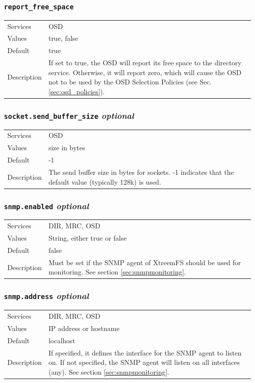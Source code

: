 \documentclass[a4paper,10pt]{book}
\begin{document}
\subsubsection{\texttt{report\_free\_space}}
\begin{tabular}{lp{10cm}}
 Services & OSD\\
 Values   & true, false\\
 Default  & true\\
 Description & If set to true, the OSD will report its free space to the directory service. Otherwise, it will report zero, which will cause the OSD not to be used by the OSD Selection Policies (see Sec. \ref{sec:osd_policies}).
\end{tabular}

\subsubsection{\texttt{socket.send\_buffer\_size} \textit{optional}}
\begin{tabular}{lp{10cm}}
 Services & OSD\\
 Values   & size in bytes\\
 Default  & -1 \\
 Description & The send buffer size in bytes for sockets. -1 indicates that the default value (typically 128k) is used.
\end{tabular}

\subsubsection{\texttt{snmp.enabled} \textit{optional}}
\begin{tabular}{lp{10cm}}
 Services & DIR, MRC, OSD\\
 Values   & String, either true or false \\
 Default  & false\\
 Description & Must be set if the SNMP agent of XtreemFS should be used for monitoring. See section \ref{sec:snmpmonitoring}.
\end{tabular}

\subsubsection{\texttt{snmp.address} \textit{optional}}
\begin{tabular}{lp{10cm}}
 Services & DIR, MRC, OSD\\
 Values   & IP address or hostname \\
 Default  & localhost \\
 Description & If specified, it defines the interface for the SNMP agent to listen on. If not specified, the SNMP agent will listen on all interfaces (any). See section \ref{sec:snmpmonitoring}.
\end{tabular}
\end{document}
